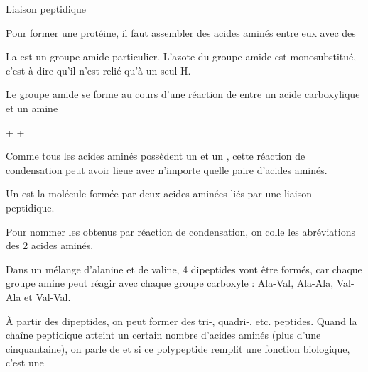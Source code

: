 \begin{doc}{Liaison peptidique}
  \begin{figure}
    \centering

  \end{figure}
  
  Pour former une protéine, il faut assembler des acides aminés entre eux avec des 

  \begin{importants}
    La  est un groupe amide particulier.
    L'azote du groupe amide est monosubstitué, c'est-à-dire qu'il n'est relié qu'à un seul H.
  \end{importants}

  Le groupe amide se forme au cours d'une réaction de  entre un acide carboxylique et un amine
  \vspace*{-4pt}
  
  \begin{center}
     +   
    \reaction
     +
    \eau
  \end{center}
  \vspace*{-4pt}

  Comme tous les acides aminés possèdent un  et un , cette réaction de condensation peut avoir lieue avec n'importe quelle paire d'acides aminés.

  \begin{importants}
    Un  est la molécule formée par deux acides aminées liés par une liaison peptidique.
    
    Pour nommer les  obtenus par réaction de condensation, on colle les abréviations des 2 acides aminés.
  \end{importants}

  Dans un mélange  d'alanine et de valine, 4 dipeptides vont être formés, car chaque groupe amine peut réagir avec chaque groupe carboxyle :
  Ala-Val, Ala-Ala, Val-Ala et Val-Val.

  \begin{importants}  
    À partir des dipeptides, on peut former des tri-, quadri-, etc. peptides.
    Quand la chaîne peptidique atteint un certain nombre d'acides aminés (plus d'une cinquantaine), on parle de  et si ce polypeptide remplit une fonction biologique, c'est une 
  \end{importants}
\end{doc}

